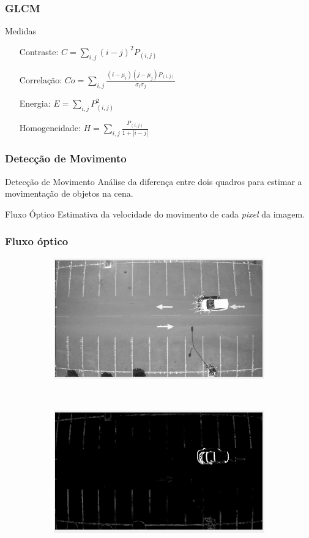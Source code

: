 \documentclass{beamer}
\begin{document}
\begin{frame}
\frametitle{GLCM}
\begin{block}{Medidas}
\begin{itemize}
\centering
\item[Contraste:] $C = \sum_{i,j} (i-j)^{2}P_{(i,j)}$
\item[Correlação:] $Co = \sum_{i,j} \frac{(i - \mu_i)(j - \mu_j)P_{(i,j)}}{\sigma_i\sigma_j}$
\item[Energia:]$E = \sum_{i,j} P_{(i,j)}^{2}$
\item[Homogeneidade:]$H = \sum_{i,j} \frac{P_{(i,j)}}{1+|i-j|}$
\centering
\end{itemize}
\end{block}
\end{frame}

\begin{frame}
\frametitle{Detecção de Movimento}
\begin{block}{Detecção de Movimento}
Análise da diferença entre dois quadros para estimar a movimentação de objetos na cena.
\end{block}
\begin{block}{Fluxo Óptico}
Estimativa da velocidade do movimento de cada \textit{pixel} da imagem.
\end{block}
\end{frame}

\begin{frame}
\frametitle{Fluxo óptico}
\begin{figure}
 \centering
\begin{subfigure}{.4\textwidth}
  \centering
  \includegraphics[width=.8\linewidth]{velocidadevetores}
	\caption{}
\end{subfigure}\
\begin{subfigure}{.4\textwidth}
  \centering
  \includegraphics[width=.8\linewidth]{velocidademagnitude}
	\caption{}
\end{subfigure}
\end{figure}
\end{frame}
\end{document}
